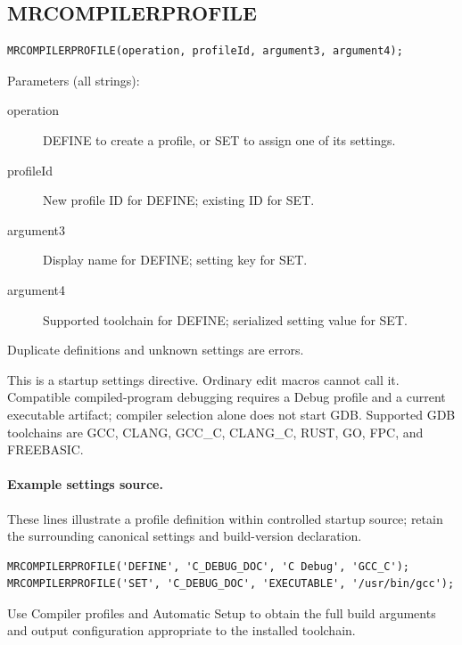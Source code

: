 \documentclass[a4paper,10pt,twoside,openany]{book}
\newenvironment{mrmacextension}{\begin{changebar}}{\end{changebar}}
\begin{document}
\begin{mrmacextension}
\label{prim:procedure-mrcompilerprofile}
\subsection*{MRCOMPILERPROFILE}
\begin{verbatim}
MRCOMPILERPROFILE(operation, profileId, argument3, argument4);
\end{verbatim}
Parameters (all strings):
\begin{description}
\item[operation] DEFINE to create a profile, or SET to assign one of its settings.
\item[profileId] New profile ID for DEFINE; existing ID for SET.
\item[argument3] Display name for DEFINE; setting key for SET.
\item[argument4] Supported toolchain for DEFINE; serialized setting value for SET.
\end{description}
Duplicate definitions and unknown settings are errors.

This is a startup settings directive. Ordinary edit macros cannot call it.
Compatible compiled-program debugging requires a Debug profile and a current
executable artifact; compiler selection alone does not start GDB. Supported
GDB toolchains are GCC, CLANG, GCC\_C, CLANG\_C, RUST, GO, FPC, and FREEBASIC.

\paragraph{Example settings source.}
These lines illustrate a profile definition within controlled startup source;
retain the surrounding canonical settings and build-version declaration.
\begin{verbatim}
MRCOMPILERPROFILE('DEFINE', 'C_DEBUG_DOC', 'C Debug', 'GCC_C');
MRCOMPILERPROFILE('SET', 'C_DEBUG_DOC', 'EXECUTABLE', '/usr/bin/gcc');
\end{verbatim}
Use Compiler profiles and Automatic Setup to obtain the full build arguments
and output configuration appropriate to the installed toolchain.
\end{mrmacextension}
\end{document}
